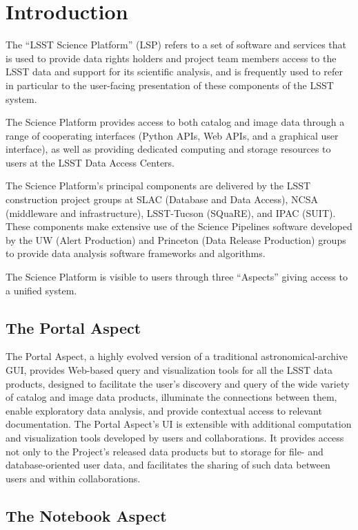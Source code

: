 \section{Introduction}\label{introduction}

The ``LSST Science Platform'' (LSP) refers to a set of software and services that is used to provide data rights holders and project team members access to the LSST data and support for its scientific analysis, and is frequently used to refer in particular to the user-facing presentation of these components of the LSST system.

The Science Platform provides access to both catalog and image data through a range of cooperating interfaces (Python APIs, Web APIs, and a graphical user interface), as well as providing dedicated computing and storage resources to users at the LSST Data Access Centers.

The Science Platform's principal components are delivered by the LSST construction project groups at SLAC (Database and Data Access), NCSA (middleware and infrastructure), LSST-Tucson (SQuaRE), and IPAC (SUIT).  These components make extensive use of the Science Pipelines software developed by the UW (Alert Production) and Princeton (Data Release Production) groups to provide data analysis software frameworks and algorithms.

The Science Platform is visible to users through three ``Aspects'' giving access to a unified system.


\subsection{The Portal Aspect}\label{portal-aspect-intro}

The Portal Aspect, a highly evolved version of a traditional astronomical-archive GUI, provides Web-based query and visualization tools for all the LSST data products, designed to facilitate the user’s discovery and query of the wide variety of catalog and image data products, illuminate the connections between them, enable exploratory data analysis, and provide contextual access to relevant documentation.
The Portal Aspect’s UI is extensible with additional computation and visualization tools developed by users and collaborations.
It provides access not only to the Project’s released data products but to storage for file- and database-oriented user data, and facilitates the sharing of such data between users and within collaborations.

\subsection{The Notebook Aspect}\label{notebook-aspect-intro}


